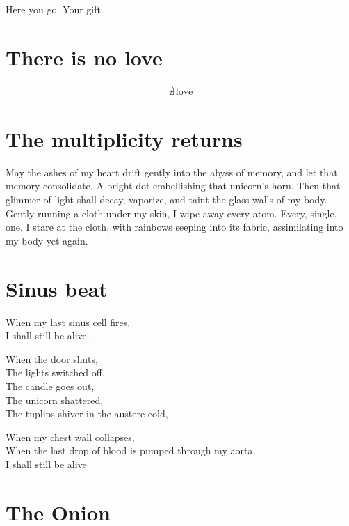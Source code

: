 \documentclass[parskip=full,12pt,oneside,openany,a5paper,numbers=endperiod]{scrbook}
\begin{document}
Here you go. Your gift.

\chapter{There is no love}

\begingroup
\fontsize{50}{60}\selectfont
\begin{align*}
	\nexists\,\text{love}
\end{align*}
\endgroup


\chapter{The multiplicity returns}

May the ashes of my heart drift gently into the abyss of memory,
and let that memory consolidate.
A bright dot embellishing that unicorn's horn.
Then that glimmer of light shall decay, vaporize, and taint the glass walls of my body.
Gently running a cloth under my skin,
I wipe away every atom.
Every, single, one.
I stare at the cloth,
with rainbows seeping into its fabric,
assimilating into my body yet again.

\chapter{Sinus beat}

When my last sinus cell fires,\\
I shall still be alive.

When the door shuts,\\
The lights switched off,\\
The candle goes out,\\
The unicorn shattered,\\
The tuplips shiver in the austere cold,

When my chest wall collapses,\\
When the last drop of blood is pumped through my aorta,\\
I shall still be alive

\chapter{The Onion}
\end{document}
